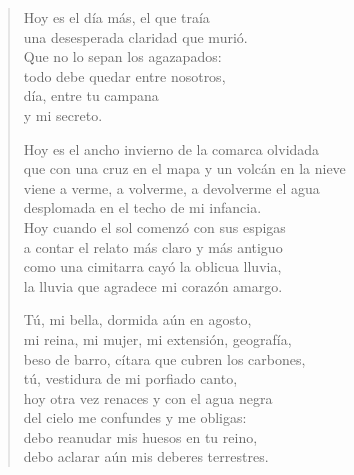 \documentclass[12pt]{article}
\begin{document}
\clearpage
{}
\begin{verse}

Hoy es el día más, el que traía\\
una desesperada claridad que murió.\\
Que no lo sepan los agazapados:\\
todo debe quedar entre nosotros,\\
día, entre tu campana\\
y mi secreto.  

Hoy es el ancho invierno de la comarca olvidada\\
que con una cruz en el mapa y un volcán en la nieve\\
viene a verme, a volverme, a devolverme el agua\\
desplomada en el techo de mi infancia.\\
Hoy cuando el sol comenzó con sus espigas\\
a contar el relato más claro y más antiguo\\
como una cimitarra cayó la oblicua lluvia,\\
la lluvia que agradece mi corazón amargo.  

Tú, mi bella, dormida aún en agosto,\\
mi reina, mi mujer, mi extensión, geografía,\\
beso de barro, cítara que cubren los carbones,\\
tú, vestidura de mi porfiado canto,\\
hoy otra vez renaces y con el agua negra\\
del cielo me confundes y me obligas:\\
debo reanudar mis huesos en tu reino,\\
debo aclarar aún mis deberes terrestres.  

\end{verse}
\end{document}
